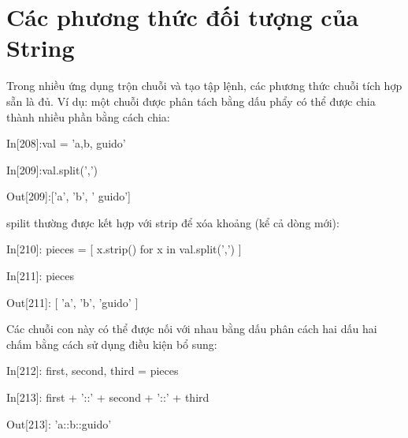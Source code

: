 \section{Các phương thức đối tượng của String}
Trong nhiều ứng dụng trộn chuỗi và tạo tập lệnh, các phương thức chuỗi tích hợp sẵn là đủ. Ví dụ: một chuỗi được phân tách bằng dấu phẩy có thể được chia thành nhiều phần bằng cách chia:\par
\hspace{1cm}In\hspace{3mm}[208]:\hspace{3mm}val = 'a,b, guido'\par
\hspace{1cm}In\hspace{3mm}[209]:\hspace{3mm}val.split(',')\par
\hspace{1cm}Out[209]:\hspace{3mm}['a', 'b', ' guido']\par
spilit thường được kết hợp với strip để xóa khoảng (kể cả dòng mới):\par
\hspace{1cm}In\hspace{3mm}[210]:\hspace{3mm} pieces = [ x.strip() for x in val.split(',') ]\par
\hspace{1cm}In\hspace{3mm}[211]:\hspace{3mm} pieces\par
\hspace{1cm}Out[211]:\hspace{3mm} [ 'a', 'b', 'guido' ]\par
Các chuỗi con này có thể được nối với nhau bằng dấu phân cách hai dấu hai chấm bằng cách sử dụng điều kiện bổ sung:\par
\hspace{1cm}In\hspace{3mm}[212]:\hspace{3mm} first, second, third = pieces \par
\hspace{1cm}In\hspace{3mm}[213]:\hspace{3mm} first + '::' + second + '::' + third \par
\hspace{1cm}Out[213]:\hspace{3mm} 'a::b::guido' \par 

